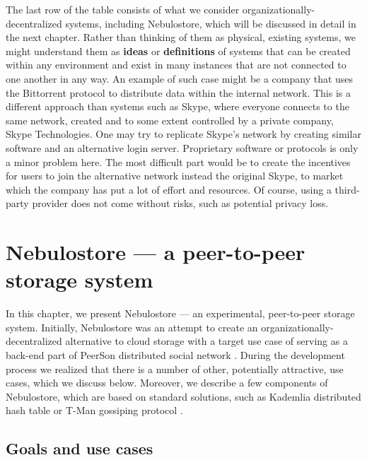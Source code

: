 \documentclass{pracamgren}
\begin{document}
The last row of the table consists of what we consider organizationally-decentralized systems, including Nebulostore, which will be discussed in detail in the next chapter. Rather than thinking of them as physical, existing systems, we might understand them as {\bf ideas} or {\bf definitions} of systems that can be created within any environment and exist in many instances that are not connected to one another in any way. An example of such case might be a company that uses the Bittorrent protocol to distribute data within the internal network. This is a different approach than systems such as Skype, where everyone connects to the same network, created and to some extent controlled by a private company, Skype Technologies. One may try to replicate Skype's network by creating similar software and an alternative login server. Proprietary software or protocols is only a minor problem here. The most difficult part would be to create the incentives for users to join the alternative network instead the original Skype, to market which the company has put a lot of effort and resources. Of course, using a third-party provider does not come without risks, such as potential privacy loss.\\




%
%
%
%
\chapter{Nebulostore --- a peer-to-peer storage system}\label{chap::nebulo}

In this chapter, we present Nebulostore --- an experimental, peer-to-peer storage system. Initially, Nebulostore was an attempt to create an organizationally-decentralized alternative to cloud storage with a target use case of serving as a back-end part of PeerSon distributed social network \cite{peerson}. During the development process we realized that there is a number of other, potentially attractive, use cases, which we discuss below. Moreover, we describe a few components of Nebulostore, which are based on standard solutions, such as Kademlia distributed hash table \cite{kademlia} or T-Man gossiping protocol \cite{tman}.\\

\section{Goals and use cases}
\end{document}
